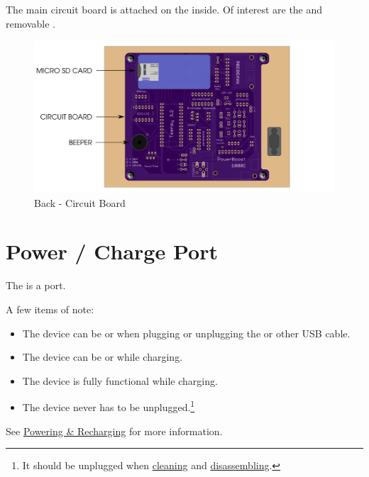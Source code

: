 The main circuit board is attached on the inside.  Of interest are
the  and removable .

\begin{figure}[H]
\centering
  \includegraphics{images/back_circuit_board.png}
\caption{Back - Circuit Board}
\end{figure}

\section{Power / Charge Port} \label{Power Port}

The  is a  port.

\par\medskip

A few items of note:

\begin{itemize}
  \item The device can be  or  when plugging or unplugging the
    \hyperref[Power Adapter]{} or other USB cable.
  \item The device can be  or  while charging.
  \item The device is fully functional while charging.
  \item The device never has to be unplugged.\footnote{ It should be unplugged
    when \hyperref[Cleaning]{cleaning} and
    \hyperref[Disassembly]{disassembling}.}
\end{itemize}

See \hyperref[Powering and Recharging]{Powering \& Recharging} for more
information.

